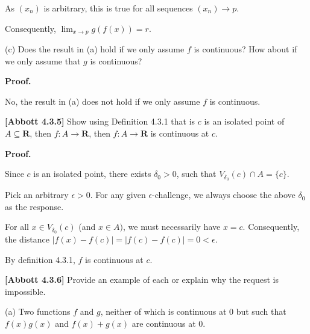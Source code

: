 \documentclass[10pt]{article}
\begin{document}
As $\displaystyle ( x_{n})$ is arbitrary, this is true for all sequences $\displaystyle ( x_{n})\rightarrow p$. 



Consequently, $\displaystyle \lim _{x\rightarrow p} g( f( x)) =r$. 



(c) Does the result in (a) hold if we only assume $\displaystyle f$ is continuous? How about if we only assume that $\displaystyle g$ is continuous?



\textbf{Proof.}



No, the result in (a) does not hold if we only assume $\displaystyle f$ is continuous. 



\textbf{[Abbott 4.3.5] }Show using Definition 4.3.1 that is $\displaystyle c$ is an isolated point of $\displaystyle A\subseteq \mathbf{R}$, then $\displaystyle f:A\rightarrow \mathbf{R}$, then $\displaystyle f:A\rightarrow \mathbf{R}$ is continuous at $\displaystyle c$.



\textbf{Proof.}



Since $\displaystyle c$ is an isolated point, there exists $\displaystyle \delta _{0}  >0$, such that $\displaystyle V_{\delta _{0}}( c) \cap A=\{c\}$. 



Pick an arbitrary $\displaystyle \epsilon  >0$. For any given $\displaystyle \epsilon $-challenge, we always choose the above $\displaystyle \delta _{0}$ as the response.



For all $\displaystyle x\in V_{\delta _{0}}( c)$ (and $\displaystyle x\in A)$, we must necessarily have $\displaystyle x=c$. Consequently, the distance $\displaystyle |f( x) -f( c) |=|f( c) -f( c) |=0< \epsilon $. 



By definition 4.3.1, $\displaystyle f$ is continuous at $\displaystyle c$.



\textbf{[Abbott 4.3.6]} Provide an example of each or explain why the request is impossible.



(a) Two functions $\displaystyle f$ and $\displaystyle g$, neither of which is continuous at $\displaystyle 0$ but such that $\displaystyle f( x) g( x)$ and $\displaystyle f( x) +g( x)$ are continuous at $\displaystyle 0$. 
\end{document}

